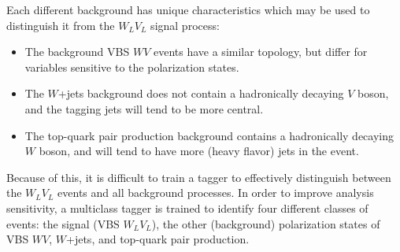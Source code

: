 \documentclass[amsmath,amssymb,aps,prd,preprint,groupedaddress]{revtex4-2}
\begin{document}
Each different background has unique characteristics which may be used to distinguish it from the $W_{L}V_{L}$ signal process: 
\begin{itemize}
  \item The background VBS $WV$ events have a similar topology, but differ for variables sensitive to the polarization states. 
  \item The $W$+jets background does not contain a hadronically decaying $V$ boson, and the tagging jets will tend to be more central.
  \item The top-quark pair production background contains a hadronically decaying $W$ boson, and will tend to have more (heavy flavor) jets in the event. 
\end{itemize}
Because of this, it is difficult to train a tagger to effectively distinguish between the $W_{L}V_{L}$ events and all background processes.
In order to improve analysis sensitivity, a multiclass tagger is trained to identify four different classes of events: 
the signal (VBS $W_{L}V_{L}$), the other (background) polarization states of VBS $WV$, $W$+jets, and top-quark pair production.
\end{document}
